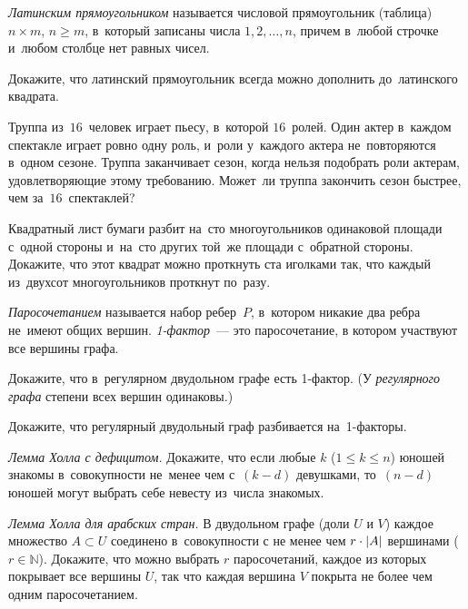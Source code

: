 \emph{Латинским прямоугольником} называется числовой прямоугольник (таблица)
$n \times m$, $n \geq m$, в~который записаны числа $1, 2, \ldots, n$, причем
в~любой строчке и~любом столбце нет равных чисел.

\begin{problems}

\item
Докажите, что латинский прямоугольник всегда можно дополнить до~латинского
квадрата.

\item
Труппа из~$16$~человек играет пьесу, в~которой $16$~ролей.
Один актер в~каждом спектакле играет ровно одну роль, и~роли у~каждого актера
не~повторяются в~одном сезоне.
Труппа заканчивает сезон, когда нельзя подобрать роли актерам, удовлетворяющие
этому требованию.
Может~ли труппа закончить сезон быстрее, чем за~$16$~спектаклей?

\item
Квадратный лист бумаги разбит на~сто многоугольников одинаковой площади с~одной
стороны и~на~сто других той~же площади с~обратной стороны.
Докажите, что этот квадрат можно проткнуть ста иголками так, что каждый
из~двухсот многоугольников проткнут по~разу.

\end{problems}

\emph{Паросочетанием} называется набор ребер~$P$, в~котором никакие два ребра
не~имеют общих вершин.
\emph{1-фактор}~--- это паросочетание, в котором участвуют все вершины графа.

\begin{problems}

\item
Докажите, что в~регулярном двудольном графе есть 1-фактор.
(У \emph{регулярного графа} степени всех вершин одинаковы.)

\item
Докажите, что регулярный двудольный граф разбивается на~1-факторы.

\item
\emph{Лемма Холла с дефицитом.}
Докажите, что если любые $k$ ($1 \leq k \leq n$) юношей знакомы в~совокупности
не~менее чем с~$(k - d)$ девушками, то~$(n - d)$ юношей могут выбрать себе
невесту из~числа знакомых.

\item
\emph{Лемма Холла для арабских стран.}
В двудольном графе (доли $U$ и $V$) каждое множество $A \subset U$ соединено
в~совокупности с не менее чем $r \cdot \lvert A \rvert$ вершинами ($r \in \mathbb{N}$).
Докажите, что можно выбрать $r$ паросочетаний, каждое из которых покрывает все
вершины $U$, так что каждая вершина $V$ покрыта не более чем одним паросочетанием.

\end{problems}

\endgroup %

